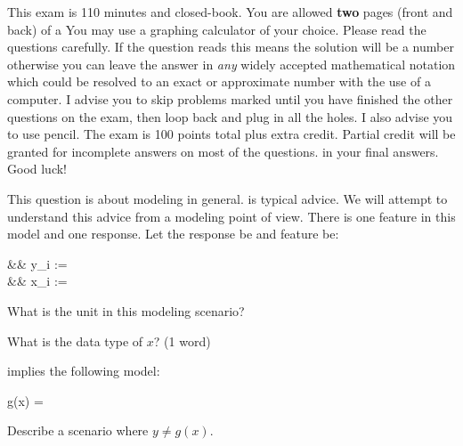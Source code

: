 \documentclass[12pt]{article}
\begin{document}
This exam is 110 minutes and closed-book. You are allowed \textbf{two} pages (front and back) of a  You may use a graphing calculator of your choice. Please read the questions carefully. If the question reads  this means the solution will be a number otherwise you can leave the answer in \textit{any} widely accepted mathematical notation which could be resolved to an exact or approximate number with the use of a computer. I advise you to skip problems marked  until you have finished the other questions on the exam, then loop back and plug in all the holes. I also advise you to use pencil. The exam is 100 points total plus extra credit. Partial credit will be granted for incomplete answers on most of the questions.  in your final answers. Good luck!

\pagebreak

\problem This question is about modeling in general.  is typical advice. We will attempt to understand this advice from a modeling point of view. There is one feature in this model and one response. Let the response be and feature be:

\beqn
&& y_i :=  \\
&& x_i  :=  \\
\eeqn

\benum

  What is the unit in this modeling scenario?\\


  What is the data type of $x$? (1 word)\\


   implies the following model:\vspace{-0.5cm}

\beqn
\hspace{-4cm}g(x) = 
\eeqn~\vspace{-0.5cm}

  Describe a scenario where $y \neq g(x)$.\\
\end{document}
